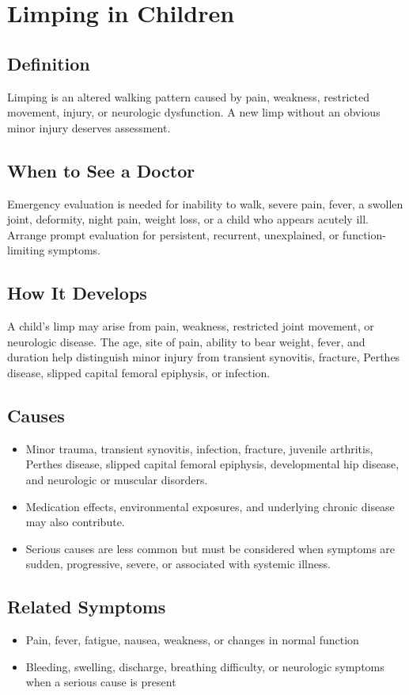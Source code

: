 \chapter{Limping in Children}

\section*{Definition}
Limping is an altered walking pattern caused by pain, weakness, restricted movement, injury, or neurologic dysfunction. A new limp without an obvious minor injury deserves assessment.

\section*{When to See a Doctor}
Emergency evaluation is needed for inability to walk, severe pain, fever, a swollen joint, deformity, night pain, weight loss, or a child who appears acutely ill. Arrange prompt evaluation for persistent, recurrent, unexplained, or function-limiting symptoms.

\section*{How It Develops}
A child's limp may arise from pain, weakness, restricted joint movement, or neurologic disease. The age, site of pain, ability to bear weight, fever, and duration help distinguish minor injury from transient synovitis, fracture, Perthes disease, slipped capital femoral epiphysis, or infection.

\section*{Causes}
\begin{itemize}
  \item Minor trauma, transient synovitis, infection, fracture, juvenile arthritis, Perthes disease, slipped capital femoral epiphysis, developmental hip disease, and neurologic or muscular disorders.
  \item Medication effects, environmental exposures, and underlying chronic disease may also contribute.
  \item Serious causes are less common but must be considered when symptoms are sudden, progressive, severe, or associated with systemic illness.
\end{itemize}

\section*{Related Symptoms}
\begin{itemize}
  \item Pain, fever, fatigue, nausea, weakness, or changes in normal function
  \item Bleeding, swelling, discharge, breathing difficulty, or neurologic symptoms when a serious cause is present
\end{itemize}

